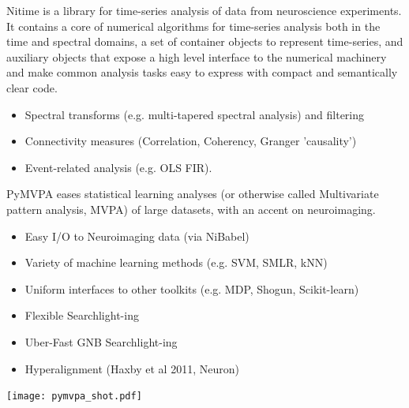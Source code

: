 \begin{multicols}{3}




Nitime is a library for time-series analysis of data from neuroscience
experiments.  It contains a core of numerical algorithms for
time-series analysis both in the time and spectral domains, a set of
container objects to represent time-series, and auxiliary objects that
expose a high level interface to the numerical machinery and make
common analysis tasks easy to express with compact and semantically
clear code.
\begin{itemize}[nolistsep,topsep=0em,leftmargin=1pc]
\item Spectral transforms (e.g. multi-tapered spectral analysis) and
filtering
\item Connectivity measures (Correlation, Coherency, Granger 'causality')
\item Event-related analysis (e.g. OLS FIR).
\end{itemize}



PyMVPA eases statistical learning analyses (or otherwise called
Multivariate pattern analysis, MVPA) of large datasets, with an accent
on neuroimaging.
\begin{itemize}[nolistsep,topsep=0em,leftmargin=1pc]
\item Easy I/O to Neuroimaging data (via NiBabel)
\item Variety of machine learning methods (e.g. SVM, SMLR, kNN)
\item Uniform interfaces to other toolkits (e.g. MDP, Shogun, Scikit-learn)
\item Flexible Searchlight-ing
\item Uber-Fast GNB Searchlight-ing
\item Hyperalignment (Haxby et al 2011, Neuron)
\end{itemize}
\texttt{[image: pymvpa\_shot.pdf]}
\\


\end{multicols}
